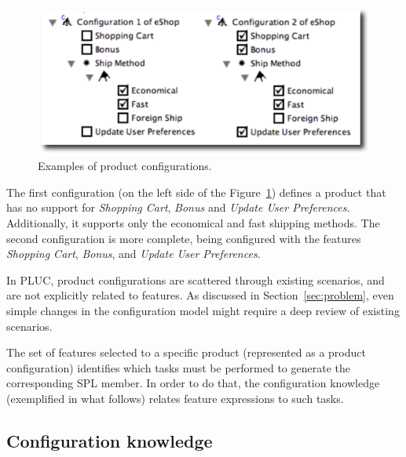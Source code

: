 \documentclass{acm_proc_article-sp}
\begin{document}
 \begin{figure}[h]
 \begin{center}
  \includegraphics[scale=0.33]{img/pc-04.eps}
   \caption{Examples of product configurations.}
  \label{fig:product-config-01-02}
  \end{center}
\end{figure}


The first configuration (on the left side of the
Figure~\ref{fig:product-config-01-02}) defines a product that has no support for
\emph{Shopping Cart}, \emph{Bonus} and \emph{Update User Preferences}.
Additionally, it supports only the economical and fast shipping methods. The
second configuration is more complete, being configured with the features
\emph{Shopping Cart}, \emph{Bonus}, and \emph{Update User Preferences}.

In PLUC, product configurations are scattered through existing scenarios, and
are not explicitly related to features. As discussed in
Section~\ref{sec:problem}, even simple changes in the configuration model might
require a deep review of existing scenarios.

The set of features selected to a specific product (represented as a product
configuration) identifies which tasks must be performed to
generate the corresponding SPL member. In order to do that, the configuration
knowledge (exemplified in what follows) relates feature expressions to such
tasks.

\subsection{Configuration knowledge}
\end{document}
